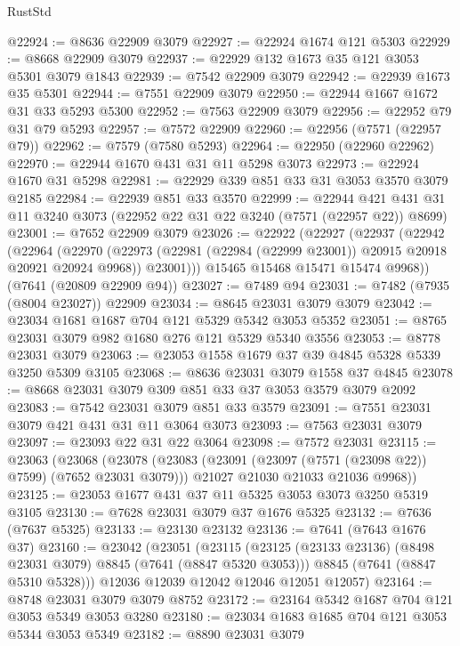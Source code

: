 \begin{lexlean}{RustStd}
\begin{coremodule}
{\begin{coremodule}
{{{{{{{{{{{{{{{{{{{{{{{{{{{{{{{{@22924 := @8636 @22909 @3079
@22927 := @22924 @1674 @121 @5303
@22929 := @8668 @22909 @3079
@22937 := @22929 @132 @1673 @35 @121 @3053 @5301 @3079 @1843
@22939 := @7542 @22909 @3079
@22942 := @22939 @1673 @35 @5301
@22944 := @7551 @22909 @3079
@22950 := @22944 @1667 @1672 @31 @33 @5293 @5300
@22952 := @7563 @22909 @3079
@22956 := @22952 @79 @31 @79 @5293
@22957 := @7572 @22909
@22960 := @22956 (@7571 (@22957 @79))
@22962 := @7579 (@7580 @5293)
@22964 := @22950 (@22960 @22962)
@22970 := @22944 @1670 @431 @31 @11 @5298 @3073
@22973 := @22924 @1670 @31 @5298
@22981 := @22929 @339 @851 @33 @31 @3053 @3570 @3079 @2185
@22984 := @22939 @851 @33 @3570
@22999 := @22944 @421 @431 @31 @11 @3240 @3073 (@22952 @22 @31 @22 @3240 (@7571 (@22957 @22)) @8699)
@23001 := @7652 @22909 @3079
@23026 := @22922
    (@22927
      (@22937
        (@22942
          (@22964
            (@22970
              (@22973 (@22981 (@22984 (@22999 @23001)) @20915 @20918 @20921 @20924 @9968))
              @23001)))
        @15465
        @15468
        @15471
        @15474
        @9968))
    (@7641 (@20809 @22909 @94))
@23027 := @7489 @94
@23031 := @7482 (@7935 (@8004 @23027)) @22909
@23034 := @8645 @23031 @3079 @3079
@23042 := @23034 @1681 @1687 @704 @121 @5329 @5342 @3053 @5352
@23051 := @8765 @23031 @3079 @982 @1680 @276 @121 @5329 @5340 @3556
@23053 := @8778 @23031 @3079
@23063 := @23053 @1558 @1679 @37 @39 @4845 @5328 @5339 @3250 @5309 @3105
@23068 := @8636 @23031 @3079 @1558 @37 @4845
@23078 := @8668 @23031 @3079 @309 @851 @33 @37 @3053 @3579 @3079 @2092
@23083 := @7542 @23031 @3079 @851 @33 @3579
@23091 := @7551 @23031 @3079 @421 @431 @31 @11 @3064 @3073
@23093 := @7563 @23031 @3079
@23097 := @23093 @22 @31 @22 @3064
@23098 := @7572 @23031
@23115 := @23063
    (@23068
      (@23078
        (@23083 (@23091 (@23097 (@7571 (@23098 @22)) @7599) (@7652 @23031 @3079)))
        @21027
        @21030
        @21033
        @21036
        @9968))
@23125 := @23053 @1677 @431 @37 @11 @5325 @3053 @3073 @3250 @5319 @3105
@23130 := @7628 @23031 @3079 @37 @1676 @5325
@23132 := @7636 (@7637 @5325)
@23133 := @23130 @23132
@23136 := @7641 (@7643 @1676 @37)
@23160 := @23042
    (@23051
      (@23115
        (@23125 (@23133 @23136) (@8498 @23031 @3079) @8845 (@7641 (@8847 @5320 @3053)))
        @8845
        (@7641 (@8847 @5310 @5328)))
      @12036
      @12039
      @12042
      @12046
      @12051
      @12057)
@23164 := @8748 @23031 @3079 @3079 @8752
@23172 := @23164 @5342 @1687 @704 @121 @3053 @5349 @3053 @3280
@23180 := @23034 @1683 @1685 @704 @121 @3053 @5344 @3053 @5349
@23182 := @8890 @23031 @3079
}}}}}}}}}}}}}}}}}}}}}}}}}}}}}}}}
\end{coremodule}}
\end{coremodule}
\end{lexlean}
